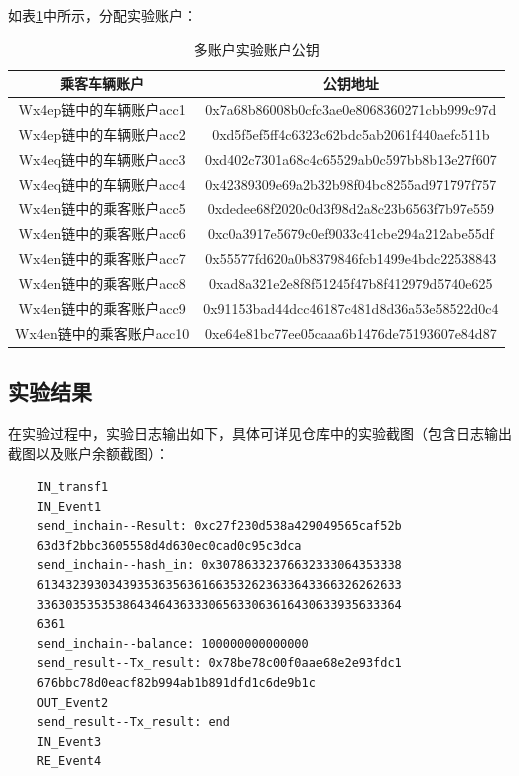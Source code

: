 如表\ref{多账户实验账户公钥}中所示，分配实验账户：

\begin{table}
    \linespread{1.5}
    \centering
    \caption{多账户实验账户公钥}\label{多账户实验账户公钥}
    \begin{tabular}{cc} \toprule
        乘客车辆账户                  & 公钥地址                                           \\ \hline
Wx4ep链中的车辆账户acc1 & 0x7a68b86008b0cfc3ae0e8068360271cbb999c97d
        \\
Wx4ep链中的车辆账户acc2   & 0xd5f5ef5ff4c6323c62bdc5ab2061f440aefc511b    
        \\
Wx4eq链中的车辆账户acc3   & 0xd402c7301a68c4c65529ab0c597bb8b13e27f607
        \\
Wx4eq链中的车辆账户acc4   & 0x42389309e69a2b32b98f04bc8255ad971797f757
        \\
Wx4en链中的乘客账户acc5  & 0xdedee68f2020c0d3f98d2a8c23b6563f7b97e559
        \\
Wx4en链中的乘客账户acc6   & 0xc0a3917e5679c0ef9033c41cbe294a212abe55df             \\
Wx4en链中的乘客账户acc7   & 0x55577fd620a0b8379846fcb1499e4bdc22538843
        \\
Wx4en链中的乘客账户acc8   & 0xad8a321e2e8f8f51245f47b8f412979d5740e625
        \\
Wx4en链中的乘客账户acc9  & 0x91153bad44dcc46187c481d8d36a53e58522d0c4
        \\
Wx4en链中的乘客账户acc10   & 0xe64e81bc77ee05caaa6b1476de75193607e84d87                             
        \\\bottomrule
    \end{tabular}
\end{table}


\subsection{实验结果}

在实验过程中，实验日志输出如下，具体可详见仓库中的实验截图（包含日志输出截图以及账户余额截图）：

\begin{verbatim}
    IN_transf1
    IN_Event1
    send_inchain--Result: 0xc27f230d538a429049565caf52b
    63d3f2bbc3605558d4d630ec0cad0c95c3dca
    send_inchain--hash_in: 0x30786332376632333064353338
    613432393034393536356361663532623633643366326262633
    336303535353864346436333065633063616430633935633364
    6361
    send_inchain--balance: 100000000000000
    send_result--Tx_result: 0x78be78c00f0aae68e2e93fdc1
    676bbc78d0eacf82b994ab1b891dfd1c6de9b1c
    OUT_Event2
    send_result--Tx_result: end
    IN_Event3
    RE_Event4
\end{verbatim}

